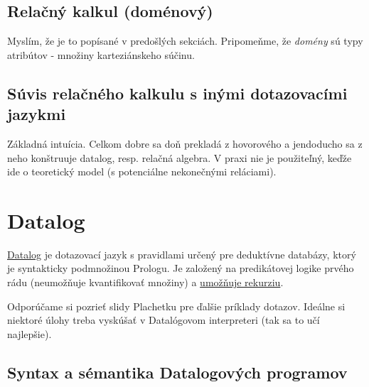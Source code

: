 \documentclass[10pt,a4paper]{article}
\begin{document}
\subsection{Relačný kalkul (doménový)}

Myslím, že je to popísané v predošlých sekciách.
Pripomeňme, že \emph{domény} sú typy atribútov - množiny karteziánskeho súčinu.


\subsection{Súvis relačného kalkulu s inými dotazovacími jazykmi}
Základná intuícia. Celkom dobre sa doň prekladá z hovorového a jendoducho sa z neho konštruuje datalog, resp. relačná algebra.
V praxi nie je použiteľný, keďže ide o teoretický model (s potenciálne nekonečnými reláciami). 
    

\section{Datalog} 
\href{http://en.wikipedia.org/wiki/Datalog}{Datalog} je dotazovací jazyk s pravidlami určený pre deduktívne databázy, ktorý je syntakticky podmnožinou Prologu. Je založený na predikátovej logike prvého rádu (neumožňuje kvantifikovať množiny) a \underline{umožňuje rekurziu}. 

Odporúčame si pozrieť slidy Plachetku pre ďalšie príklady dotazov.
Ideálne si niektoré úlohy treba vyskúšať v Datalógovom interpreteri (tak sa to učí najlepšie).

\subsection{Syntax a sémantika Datalogových programov}
\end{document}
